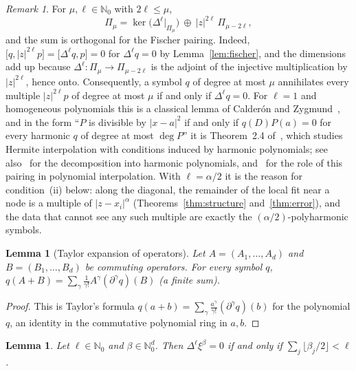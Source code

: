 \documentclass[12pt]{amsart}
\newtheorem{lemma}[theorem]{Lemma}
\theoremstyle{definition}
\theoremstyle{remark}
\newtheorem{remark}[theorem]{Remark}
\newcommand{\N}{\mathbb{N}}
\newcommand{\fp}[2]{\bigl[#1,#2\bigr]}          %
\begin{document}
\begin{remark}\label{rem:decomposition}
For $\mu,\ell\in\N_0$ with $2\ell\le \mu$,
\begin{equation}\label{eq:decomposition}
  \Pi_\mu=\ker\bigl(\Delta^\ell\big|_{\Pi_\mu}\bigr)\ \oplus\ |z|^{2\ell}\,\Pi_{\mu-2\ell},
\end{equation}
and the sum is orthogonal for the Fischer pairing. Indeed, $\fp{q}{|z|^{2\ell}p}=\fp{\Delta^\ell q}{p}=0$
for $\Delta^\ell q=0$ by Lemma~\ref{lem:fischer}, and the dimensions add up because
$\Delta^\ell\colon\Pi_\mu\to\Pi_{\mu-2\ell}$ is the adjoint of the injective multiplication by
$|z|^{2\ell}$, hence onto. Consequently, a symbol $q$ of degree at most $\mu$ annihilates every
multiple $|z|^{2\ell}p$ of degree at most $\mu$ if and only if $\Delta^\ell q=0$. For $\ell=1$ and
homogeneous polynomials this is a classical lemma of Calder\'on and
Zygmund~\cite[Ch.~2, Lemma~1]{CalderonZygmund1964}, and in the form ``$P$ is divisible by
$|x-a|^2$ if and only if $q(D)P(a)=0$ for every harmonic $q$ of degree at most $\deg P$'' it is
Theorem~2.4 of~\cite{ToanMaiLongPhung2026}, which studies Hermite interpolation with conditions
induced by harmonic polynomials; see also~\cite[Ch.~IV]{SteinWeiss1971} for the decomposition
into harmonic polynomials, and~\cite{deBoorRon1992} for the role of this pairing in polynomial
interpolation. With $\ell=\alpha/2$ it is the reason for condition~(ii)
below: along the diagonal, the remainder of the local fit near a node is a multiple of
$|z-x_i|^\alpha$ (Theorems~\ref{thm:structure} and~\ref{thm:error}), and the data that cannot see any such multiple are exactly the
$(\alpha/2)$-polyharmonic symbols.
\end{remark}

\begin{lemma}[Taylor expansion of operators]\label{lem:taylor}
Let $A=(A_1,\dots,A_d)$ and $B=(B_1,\dots,B_d)$ be commuting operators. For every symbol $q$,
$q(A+B)=\sum_{\gamma}\frac{1}{\gamma!}A^\gamma(\partial^\gamma q)(B)$ (a finite sum).
\end{lemma}

\begin{proof}
This is Taylor's formula $q(a+b)=\sum_\gamma\frac{a^\gamma}{\gamma!}(\partial^\gamma q)(b)$ for
the polynomial $q$, an identity in the commutative polynomial ring in $a,b$.
\end{proof}

\begin{lemma}\label{lem:harmonic-monomial}
Let $\ell\in\N_0$ and $\beta\in\N_0^d$. Then $\Delta^\ell\xi^\beta=0$ if and only if
$\sum_j\lfloor\beta_j/2\rfloor<\ell$.
\end{lemma}
\end{document}
